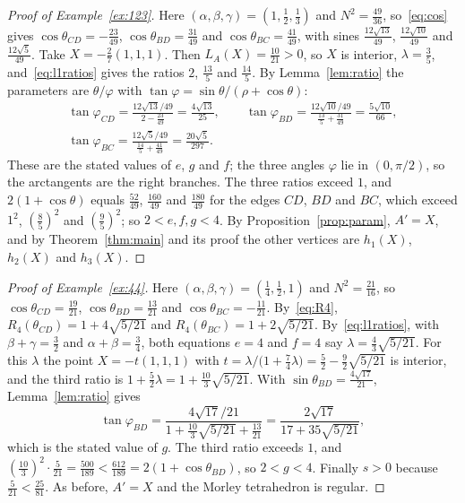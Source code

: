 \documentclass[11pt]{amsart}
\theoremstyle{definition}
\theoremstyle{remark}
\numberwithin{equation}{section}
\begin{document}
\begin{proof}[Proof of Example~\ref{ex:123}]
Here $(\alpha,\beta,\gamma)=(1,\tfrac12,\tfrac13)$ and $N^2=\tfrac{49}{36}$, so~\eqref{eq:cos} gives $\cos\theta_{CD}=-\tfrac{23}{49}$, $\cos\theta_{BD}=\tfrac{31}{49}$ and $\cos\theta_{BC}=\tfrac{41}{49}$, with sines $\tfrac{12\sqrt{13}}{49}$, $\tfrac{12\sqrt{10}}{49}$ and $\tfrac{12\sqrt5}{49}$. Take $X=-\tfrac27(1,1,1)$. Then $L_A(X)=\tfrac{10}{21}>0$, so $X$ is interior, $\lambda=\tfrac35$, and~\eqref{eq:l1ratios} gives the ratios $2$, $\tfrac{13}{5}$ and $\tfrac{14}{5}$. By Lemma~\ref{lem:ratio} the parameters are $\theta/\varphi$ with $\tan\varphi=\sin\theta/(\rho+\cos\theta)$:
\begin{gather*}
\tan\varphi_{CD}=\frac{12\sqrt{13}/49}{2-\frac{23}{49}}=\frac{4\sqrt{13}}{25},\qquad
\tan\varphi_{BD}=\frac{12\sqrt{10}/49}{\frac{13}{5}+\frac{31}{49}}=\frac{5\sqrt{10}}{66},\\
\tan\varphi_{BC}=\frac{12\sqrt5/49}{\frac{14}{5}+\frac{41}{49}}=\frac{20\sqrt5}{297}.
\end{gather*}
These are the stated values of $e$, $g$ and $f$; the three angles $\varphi$ lie in $(0,\pi/2)$, so the arctangents are the right branches. The three ratios exceed $1$, and $2(1+\cos\theta)$ equals $\tfrac{52}{49}$, $\tfrac{160}{49}$ and $\tfrac{180}{49}$ for the edges $CD$, $BD$ and $BC$, which exceed $1^2$, $(\tfrac85)^2$ and $(\tfrac95)^2$; so $2<e,f,g<4$. By Proposition~\ref{prop:param}, $A'=X$, and by Theorem~\ref{thm:main} and its proof the other vertices are $h_1(X)$, $h_2(X)$ and $h_3(X)$.
\end{proof}

\begin{proof}[Proof of Example~\ref{ex:44}]
Here $(\alpha,\beta,\gamma)=(\tfrac14,\tfrac12,1)$ and $N^2=\tfrac{21}{16}$, so $\cos\theta_{CD}=\tfrac{19}{21}$, $\cos\theta_{BD}=\tfrac{13}{21}$ and $\cos\theta_{BC}=-\tfrac{11}{21}$. By~\eqref{eq:R4}, $R_4(\theta_{CD})=1+4\sqrt{5/21}$ and $R_4(\theta_{BC})=1+2\sqrt{5/21}$. By~\eqref{eq:l1ratios}, with $\beta+\gamma=\tfrac32$ and $\alpha+\beta=\tfrac34$, both equations $e=4$ and $f=4$ say $\lambda=\tfrac43\sqrt{5/21}$. For this $\lambda$ the point $X=-t(1,1,1)$ with $t=\lambda/\bigl(1+\tfrac74\lambda\bigr)=\tfrac52-\tfrac92\sqrt{5/21}$ is interior, and the third ratio is $1+\tfrac52\lambda=1+\tfrac{10}{3}\sqrt{5/21}$. With $\sin\theta_{BD}=\tfrac{4\sqrt{17}}{21}$, Lemma~\ref{lem:ratio} gives
\[
\tan\varphi_{BD}=\frac{4\sqrt{17}/21}{1+\frac{10}{3}\sqrt{5/21}+\frac{13}{21}}=\frac{2\sqrt{17}}{17+35\sqrt{5/21}},
\]
which is the stated value of $g$. The third ratio exceeds $1$, and $(\tfrac{10}{3})^2\cdot\tfrac{5}{21}=\tfrac{500}{189}<\tfrac{612}{189}=2(1+\cos\theta_{BD})$, so $2<g<4$. Finally $s>0$ because $\tfrac{5}{21}<\tfrac{25}{81}$. As before, $A'=X$ and the Morley tetrahedron is regular.
\end{proof}
\end{document}
